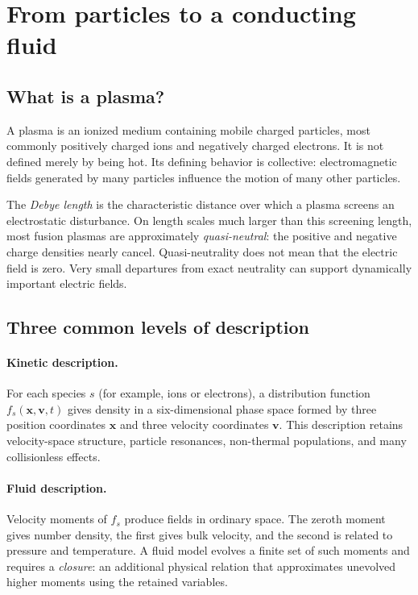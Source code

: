 \documentclass[11pt]{article}
\newcommand{\vect}[1]{\bm{#1}}
\begin{document}
\section{From particles to a conducting fluid}
\label{sec:plasmafluid}

\subsection{What is a plasma?}

A plasma is an ionized medium containing mobile charged particles, most commonly positively charged ions and negatively charged electrons. It is not defined merely by being hot. Its defining behavior is collective: electromagnetic fields generated by many particles influence the motion of many other particles.

The \emph{Debye length} is the characteristic distance over which a plasma screens an electrostatic disturbance. On length scales much larger than this screening length, most fusion plasmas are approximately \emph{quasi-neutral}: the positive and negative charge densities nearly cancel. Quasi-neutrality does not mean that the electric field is zero. Very small departures from exact neutrality can support dynamically important electric fields.

\subsection{Three common levels of description}

\paragraph{Kinetic description.}
For each species $s$ (for example, ions or electrons), a distribution function $f_s(\vect{x},\vect{v},t)$ gives density in a six-dimensional phase space formed by three position coordinates $\vect{x}$ and three velocity coordinates $\vect{v}$. This description retains velocity-space structure, particle resonances, non-thermal populations, and many collisionless effects.

\paragraph{Fluid description.}
Velocity moments of $f_s$ produce fields in ordinary space. The zeroth moment gives number density, the first gives bulk velocity, and the second is related to pressure and temperature. A fluid model evolves a finite set of such moments and requires a \emph{closure}: an additional physical relation that approximates unevolved higher moments using the retained variables.
\end{document}
